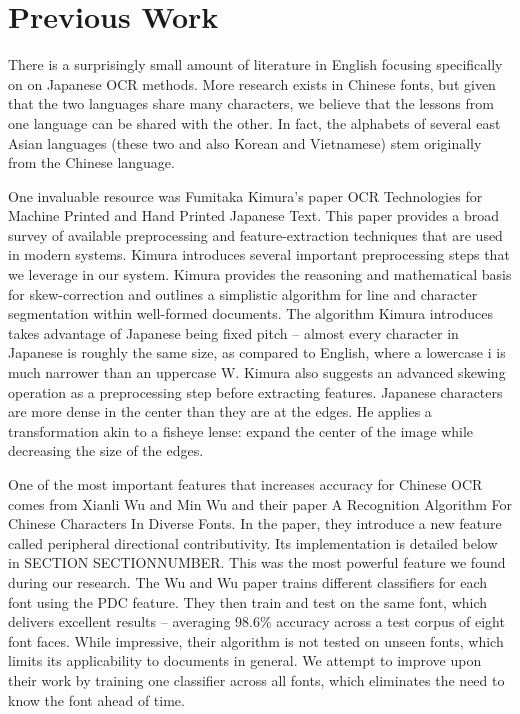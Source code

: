 \documentclass[10pt,twocolumn,letterpaper]{article}
\begin{document}
\section{Previous Work}
There is a surprisingly small amount of literature in English focusing specifically on on Japanese OCR methods. More research exists in Chinese fonts, but given that the two languages share many characters, we believe that the lessons from one language can be shared with the other. In fact, the alphabets of several east Asian languages (these two and also Korean and Vietnamese) stem originally from the Chinese language.

One invaluable resource was Fumitaka Kimura’s paper OCR Technologies for Machine Printed and Hand Printed Japanese Text. This paper provides a broad survey of available preprocessing and feature-extraction techniques that are used in modern systems. Kimura introduces several important preprocessing steps that we leverage in our system. Kimura provides the reasoning and mathematical basis for skew-correction and outlines a simplistic algorithm for line and character segmentation within well-formed documents. The algorithm Kimura introduces takes advantage of Japanese being fixed pitch -- almost every character in Japanese is roughly the same size, as compared to English, where a lowercase i is much narrower than an uppercase W. Kimura also suggests an advanced skewing operation as a preprocessing step before extracting features. Japanese characters are more dense in the center than they are at the edges. He applies a transformation akin to a fisheye lense: expand the center of the image while decreasing the size of the edges.

One of the most important features that increases accuracy for Chinese OCR comes from Xianli Wu and Min Wu and their paper A Recognition Algorithm For Chinese Characters In Diverse Fonts. In the paper, they introduce a new feature called peripheral directional contributivity. Its implementation is detailed below in SECTION SECTIONNUMBER. This was the most powerful feature we found during our research. The Wu and Wu paper trains different classifiers for each font using the PDC feature. They then train and test on the same font, which delivers excellent results -- averaging 98.6\% accuracy across a test corpus of eight font faces. While impressive, their algorithm is not tested on unseen fonts, which limits its applicability to documents in general. We attempt to improve upon their work by training one classifier across all fonts, which eliminates the need to know the font ahead of time.
\end{document}
